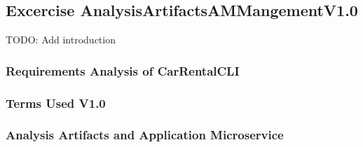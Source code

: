 \subsection{Excercise AnalysisArtifactsAMMangementV1.0}
TODO: Add introduction
\subsubsection*{Requirements Analysis of CarRentalCLI}

\subsubsection*{Terms Used V1.0}

\subsubsection*{Analysis Artifacts and Application Microservice}